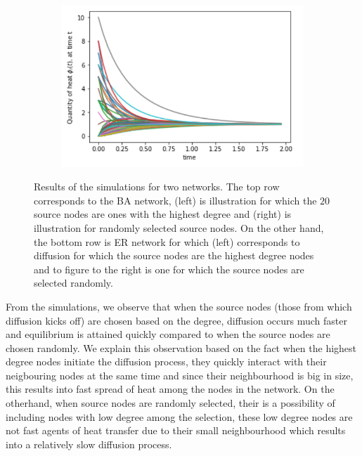 \documentclass[10pt,a4paper]{article}
\theoremstyle{plain}
\theoremstyle{definition}
\begin{document}
\begin{figure}[H]
\begin{subfigure}[b]{0.45\textwidth}
     		\caption{}
     		\label{}
     	\end{subfigure}~
     	\begin{subfigure}[b]{0.45\textwidth}
     		\includegraphics[width= \textwidth]{images/ER-randomsource.png}
     		\caption{}
     		\label{}
     	\end{subfigure}
     	\caption{ Results of the simulations for two networks. The top row corresponds to the BA network, (left) is illustration for which the $20$ source nodes are ones with the highest degree and (right) is illustration for randomly selected source nodes. On the other hand, the bottom row is ER network for which (left) corresponds to diffusion for which the source nodes are the highest degree nodes and to figure to the right is one for which the source nodes are selected randomly.}
     	\label{sourceimpact}
     \end{figure}
     
     From the simulations, we observe that when the source nodes (those  from which diffusion kicks off) are chosen based on the degree, diffusion occurs much faster and equilibrium is attained quickly compared to when the source nodes are chosen randomly. We explain this observation based on the fact when the highest degree nodes initiate the diffusion process, they quickly interact with their neigbouring nodes at the same time and since their neighbourhood is big in size, this results into fast spread of heat among the nodes in the network. On the otherhand, when source nodes are randomly selected, their is a possibility of including nodes with low degree among the selection, these low degree nodes are not fast agents of heat transfer due to their small neighbourhood which results into a relatively slow diffusion process.
     
\end{document}
